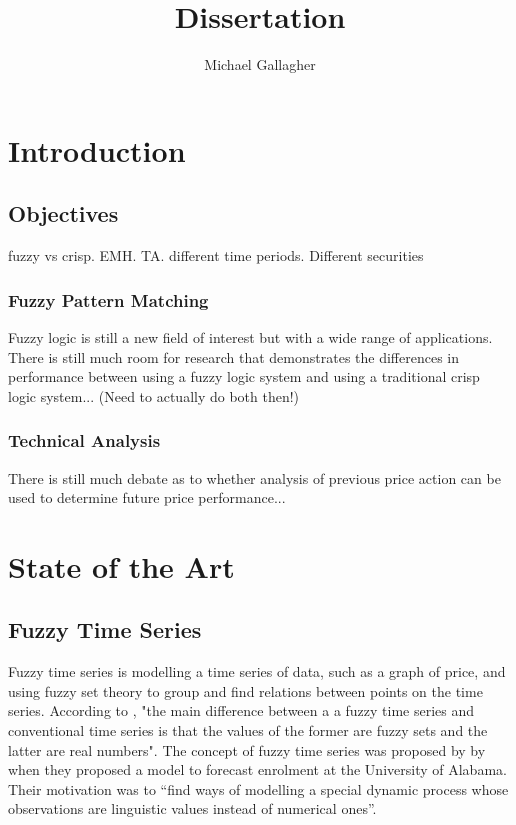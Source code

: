 \documentclass{article}
\title{Dissertation}
\author{Michael Gallagher}
\theoremstyle{definition}
\begin{document}
\maketitle

\tableofcontents

\section{Introduction}

\subsection{Objectives}

fuzzy vs crisp. EMH. TA. different time periods. Different securities

\subsubsection{Fuzzy Pattern Matching}

Fuzzy logic is still a new field of interest but with a wide range of applications. There is still much room for research that demonstrates the differences in performance between using a fuzzy logic system and using a traditional crisp logic system... (Need to actually do both then!)

\subsubsection{Technical Analysis}

There is still much debate as to whether analysis of previous price action can be used to determine future price performance...

\section{State of the Art}

\subsection{Fuzzy Time Series}

Fuzzy time series is modelling a time series of data, such as a graph of price, and using fuzzy set theory to group and find relations between points on the time series. According to \cite{chen1996forecasting}, "the main difference between a a fuzzy time series and conventional time series is that the values of the former are fuzzy sets and the latter are real numbers". The concept of fuzzy time series was proposed by by \cite{song1993forecasting, song1994forecasting} when they proposed a model to forecast enrolment at the University of Alabama. Their motivation was to ``find ways of modelling a special dynamic process whose observations are linguistic values instead of numerical ones''. 
\end{document}
